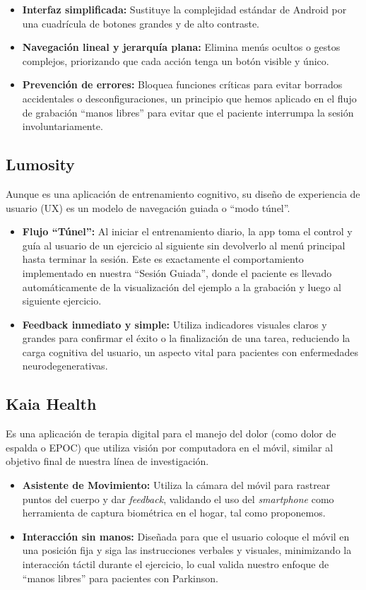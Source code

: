 \begin{itemize}
    \item \textbf{Interfaz simplificada:} Sustituye la complejidad estándar de Android por una cuadrícula de botones grandes y de alto contraste.
    \item \textbf{Navegación lineal y jerarquía plana:} Elimina menús ocultos o gestos complejos, priorizando que cada acción tenga un botón visible y único.
    \item \textbf{Prevención de errores:} Bloquea funciones críticas para evitar borrados accidentales o desconfiguraciones, un principio que hemos aplicado en el flujo de grabación ``manos libres'' para evitar que el paciente interrumpa la sesión involuntariamente.
\end{itemize}

\subsection{Lumosity}

Aunque es una aplicación de entrenamiento cognitivo, su diseño de experiencia de usuario (UX) es un modelo de navegación guiada o ``modo túnel''.  

\begin{itemize}
    \item \textbf{Flujo ``Túnel'':} Al iniciar el entrenamiento diario, la app toma el control y guía al usuario de un ejercicio al siguiente sin devolverlo al menú principal hasta terminar la sesión. Este es exactamente el comportamiento implementado en nuestra ``Sesión Guiada'', donde el paciente es llevado automáticamente de la visualización del ejemplo a la grabación y luego al siguiente ejercicio.
    \item \textbf{Feedback inmediato y simple:} Utiliza indicadores visuales claros y grandes para confirmar el éxito o la finalización de una tarea, reduciendo la carga cognitiva del usuario, un aspecto vital para pacientes con enfermedades neurodegenerativas.
\end{itemize}

\subsection{Kaia Health}

Es una aplicación de terapia digital para el manejo del dolor (como dolor de espalda o EPOC) que utiliza visión por computadora en el móvil, similar al objetivo final de nuestra línea de investigación. 

\begin{itemize}
    \item \textbf{Asistente de Movimiento:} Utiliza la cámara del móvil para rastrear puntos del cuerpo y dar \textit{feedback}, validando el uso del \textit{smartphone} como herramienta de captura biométrica en el hogar, tal como proponemos.
    \item \textbf{Interacción sin manos:} Diseñada para que el usuario coloque el móvil en una posición fija y siga las instrucciones verbales y visuales, minimizando la interacción táctil durante el ejercicio, lo cual valida nuestro enfoque de ``manos libres'' para pacientes con Parkinson.
\end{itemize}